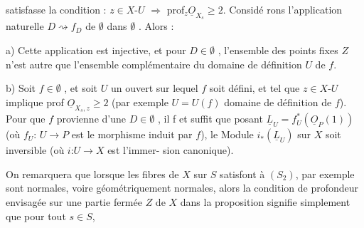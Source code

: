  satisfasse la condition : $z \in X$-$U$ $\Longrightarrow$ prof$_z \underline{O}_{X_s} \geqslant 2$. Considé
rons l'application naturelle  $D \rightsquigarrow f_D$  de $\emptyset$  dans $\emptyset$ .  Alors :

a)  Cette application est injective,  et  pour $D \in \emptyset$ , l'ensemble des
points fixes $Z$  n'est autre que l'ensemble  complémentaire du domaine de
définition  $U$ de $f$.

b)   Soit
$f \in \emptyset$ , et soit $U$ un ouvert sur lequel $f$ soit défini, et tel que $z \in X$-$U$
implique prof $\underline{O}_{X_s,z} \geqslant 2$  (par exemple $U = U(f)$ domaine de
définition de $f$). Pour que $f$ provienne d'une $D \in \emptyset$ , il f et suffit  que\hand{\unsure{$\surd$}}
posant $\underline{L}_U = f_U^*(\underline{O}_P(1))$  (où  $f_U$: $U \to P$  est le morphisme induit par $f$),
 le Module  $i_*(\underline{L}_U)$  sur $X$ soit inversible (où $i$:$U \to X$ est l'immer-%
sion canonique).

On remarquera que lorsque  les fibres de $X$ sur $S$ satisfont à $(S_2)$,
par exemple sont normales, voire géométriquement  normales, alors la
condition de profondeur  envisagée sur  une partie fermée $Z$ de $X$ dans 
la proposition  signifie simplement que pour tout $s \in S$,

